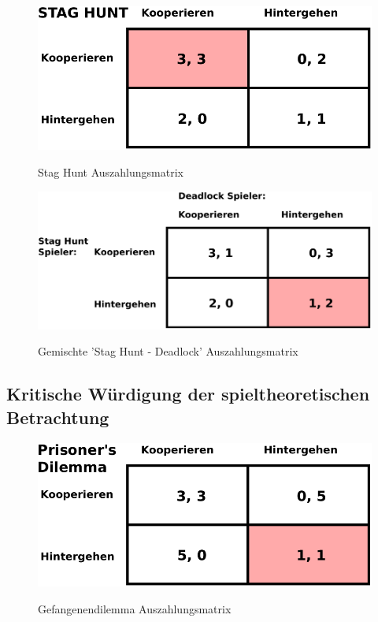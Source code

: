 \begin{figure}%
\centering
\caption{Stag Hunt Auszahlungsmatrix}
\includegraphics[scale=0.8]{Grafiken/Stag_Hunt_Ink.pdf} 
\label{pic:StagHunt}
\end{figure}

\begin{figure}%
\centering
\caption{Gemischte 'Stag Hunt - Deadlock' Auszahlungsmatrix}
\includegraphics[scale=0.8]{Grafiken/Mixed_Ink.pdf} 
\label{pic:Mixed}
\end{figure}

\subsection{Kritische Würdigung der spieltheoretischen Betrachtung}


\begin{figure}%
\centering
\caption{Gefangenendilemma Auszahlungsmatrix}
\includegraphics[scale=0.8]{Grafiken/Prisoner_Ink.pdf} 
\label{pic:Prisoner}
\end{figure}